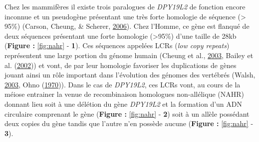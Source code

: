 \documentclass[12pt,twoside]{reedthesis}
\theoremstyle{definition}
\theoremstyle{definition}
\theoremstyle{remark}
\begin{document}
  Chez les mammifères il existe trois paralogues de \emph{DPY19L2} de
  fonction encore inconnue et un pseudogène présentant une très forte
  homologie de séquence (\textgreater{} 95\%) (Carson, Cheung, \& Scherer,
  \protect\hyperlink{ref-Carson2006}{2006}). Chez l'Homme, ce gène est
  flanqué de deux séquences présentant une forte homologie
  (\textgreater{}95\%) d'une taille de 28kb (\textbf{Figure :
  }\ref{fig:nahr} - \textbf{1}). Ces séquences appelées LCRs (\emph{low
  copy repeats}) représentent une large portion du génome humain (Cheung
  et al., \protect\hyperlink{ref-Cheung2003}{2003}, Bailey et al.
  (\protect\hyperlink{ref-Bailey2002}{2002})) et vont, de par leur
  homologie favoriser les duplications de gènes jouant ainsi un rôle
  important dans l'évolution des génomes des vertébrés (Walsh,
  \protect\hyperlink{ref-Walsh2003}{2003}, Ohno
  (\protect\hyperlink{ref-Ohno1970}{1970})). Dans le cas de
  \emph{DPY19L2}, ces LCRs vont, au cours de la méiose entrainer la venue
  de recombinaison homologues non-allélique (NAHR) donnant lieu soit à une
  délétion du gène \emph{DPY19L2} et la formation d'un ADN circulaire
  comprenant le gène (\textbf{Figure : }\ref{fig:nahr} - \textbf{2}) soit
  à un allèle possédant deux copies du gène tandis que l'autre n'en
  possède aucune (\textbf{Figure : }\ref{fig:nahr} - \textbf{3}).
  
\end{document}
